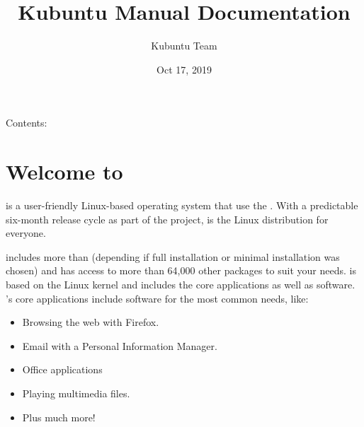 \documentclass[letterpaper,10pt,english]{sphinxmanual}
\title{Kubuntu Manual Documentation}
\date{Oct 17, 2019}
\author{Kubuntu Team}
\begin{document}
\pagestyle{empty}
\sphinxmaketitle
\pagestyle{plain}
\sphinxtableofcontents
\pagestyle{normal}
\label{\detokenize{index::doc}}


Contents:


\chapter{Welcome to }
\label{\detokenize{welcome:welcome-to-kubuntu}}\label{\detokenize{welcome::doc}}

 is a user-friendly Linux-based operating system that use the  . With a predictable
six-month release cycle as part of the  project,  is the Linux distribution for everyone.

 includes more than  (depending if full installation or minimal installation was chosen) and has access to more than 64,000 other packages to suit your needs.  is based on the Linux kernel and includes the core  applications as well as  software. ’s core applications include software for the most common needs, like:
\begin{itemize}
\item {} 
Browsing the web with Firefox.

\item {} 
Email with a Personal Information Manager.

\item {} 
Office applications

\item {} 
Playing multimedia files.

\item {} 
Plus much more!

\end{itemize}
\end{document}
